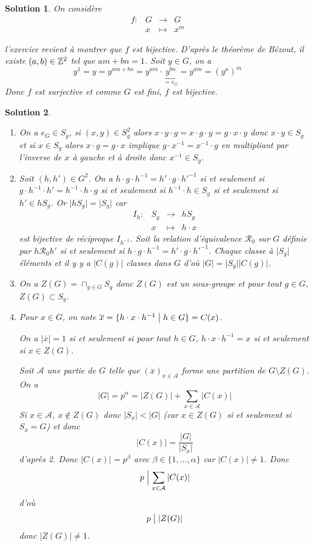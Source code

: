 \documentclass[12pt]{article}
\newtheorem{solution}{Solution}[section]
\theoremstyle{remark}
\newcommand{\function}[5]{
	$$
	\begin{array}{rccl}
		#1: & #2 & \to & #3 \\
		& #4 & \mapsto & #5
	\end{array}
	$$
}
\numberwithin{equation}{section}
\begin{document}
\begin{solution}
	On considère \function{f}{G}{G}{x}{x^{m}}
	l'exercice revient à montrer que $f$ est bijective. D'après le théorème de Bézout, il existe $(a,b)\in\mathbb{Z}^{2}$ tel que $am+bn=1$. Soit $y\in G$, on a 
	$$y^{1}=y=y^{am+bn}=y^{am}\cdot \underbrace{y^{bn}}_{=e_{G}}=y^{am}=(y^{a})^{m}$$
	Donc $f$ est surjective et comme $G$ est fini, $f$ est bijective.
\end{solution}

\begin{solution}
	\phantom{}
	\begin{enumerate}
		\item On a $e_{G}\in S_{g}$, si $(x,y)\in S_{g}^{2}$ alors $x\cdot y\cdot g=x\cdot g\cdot y=g\cdot x\cdot y$ donc $x\cdot y\in S_{g}$ et si $x\in S_{g}$ alors $x\cdot g=g\cdot x$ implique $g\cdot x^{-1}=x^{-1}\cdot g$ en multipliant par l'inverse de $x$ à gauche et à droite donc $x^{-1}\in S_{g}$.
		
		\item Soit $(h,h')\in G^{2}$. On a $h\cdot g\cdot h^{-1}=h'\cdot g\cdot h'^{-1}$ si et seulement si $g\cdot h^{-1}\cdot h'=h^{-1}\cdot h\cdot g$ si et seulement si $h^{-1}\cdot h\in S_{g}$ si et seulement si $h'\in hS_{g}$. Or $\vert hS_{g}\vert=\vert S_{g}\vert$ car \function{I_{h}}{S_{g}}{hS_{g}}{x}{h\cdot x} est bijective de réciproque $I_{h^{-1}}$. Soit la relation d'équivalence $\mathcal{R}_{0}$ sur $G$ définie par $h\mathcal{R}_{0}h'$ si et seulement si $h\cdot g\cdot h^{-1}=h'\cdot g\cdot h'^{-1}$. Chaque classe à $\vert S_{g}\vert$ éléments et il y y a $\vert C(g)\vert$ classes dans $G$ d'où $\vert G\vert=\vert S_{g}\vert\vert C(g)\vert$.
		
		\item On a $Z(G)=\cap_{g\in G}S_{g}$ donc $Z(G)$ est un sous-groupe et pour tout $g\in G$, $Z(G)\subset S_{g}$.
		
		\item Pour $x\in G$, on note $\overline{x}=\{h\cdot x\cdot h^{-1}\bigm| h\in G\}=C(x)$. 
		
		On a $\vert\overline{x}\vert=1$ si et seulement si pour tout $h\in G$, $h\cdot x\cdot h^{-1}=x$ si et seulement si $x\in Z(G)$.
		
		Soit $\mathcal{A}$ une partie de $G$ telle que $(\overline{x})_{x\in\mathcal{A}}$ forme une partition de $G\setminus Z(G)$. On a 
		$$\vert G\vert=p^{\alpha}=\vert Z(G)\vert+\sum_{x\in\mathcal{A}}\vert C(x)\vert$$
		Si $x\in\mathcal{A}$, $x\notin Z(G)$ donc $\vert S_{x}\vert <\vert G\vert$ (car $x\in Z(G)$ si et seulement si $S_{x}=G$) et donc 
		$$\vert C(x)\vert=\frac{\vert G\vert}{\vert S_{x}\vert}$$
		d'après 2. Donc $\vert C(x)\vert=p^{\beta}$ avec $\beta\in\{1,\dots,\alpha\}$ car $\vert C(x)\vert\neq 1$. Donc 
		$$p\Bigm|\sum_{x\in\mathcal{A}}\vert C(x)\vert$$
		d'où 
		$$p\bigm|\vert Z(G)\vert$$
		donc $\vert Z(G)\vert\neq1$.


\end{enumerate}
\end{solution}
\end{document}
